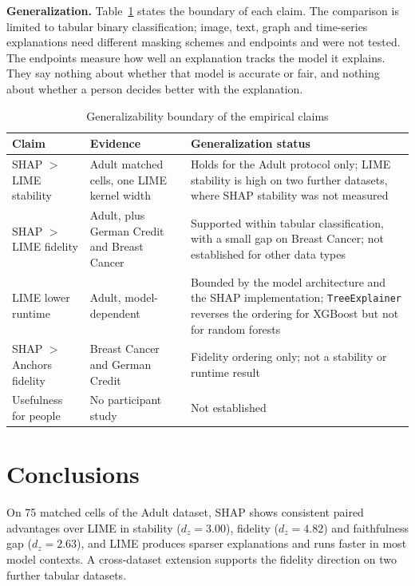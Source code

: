 \documentclass{cleiej}
\begin{document}
\textbf{Generalization.} Table~\ref{tab:generalizability_boundary} states
the boundary of each claim. The comparison is limited to tabular binary
classification; image, text, graph and time-series explanations need
different masking schemes and endpoints and were not tested. The endpoints
measure how well an explanation tracks the model it explains. They say
nothing about whether that model is accurate or fair, and nothing about
whether a person decides better with the explanation.

\begin{table}[htb]
\centering
\caption{Generalizability boundary of the empirical claims}
\label{tab:generalizability_boundary}
\begin{tabularx}{\linewidth}{p{3.0cm} X X}
\toprule
\textbf{Claim} & \textbf{Evidence} & \textbf{Generalization status} \\
\midrule
SHAP $>$ LIME stability & Adult matched cells, one LIME kernel width & Holds for the Adult protocol only; LIME stability is high on two further datasets, where SHAP stability was not measured \\
SHAP $>$ LIME fidelity & Adult, plus German Credit and Breast Cancer & Supported within tabular classification, with a small gap on Breast Cancer; not established for other data types \\
LIME lower runtime & Adult, model-dependent & Bounded by the model architecture and the SHAP implementation; \texttt{TreeExplainer} reverses the ordering for XGBoost but not for random forests \\
SHAP $>$ Anchors fidelity & Breast Cancer and German Credit & Fidelity ordering only; not a stability or runtime result \\
Usefulness for people & No participant study & Not established \\
\bottomrule
\end{tabularx}
\end{table}

\section{Conclusions}
\label{sec:conclusion}

On 75 matched cells of the Adult dataset, SHAP shows consistent paired
advantages over LIME in stability ($d_z = 3.00$), fidelity ($d_z = 4.82$)
and faithfulness gap ($d_z = 2.63$), and LIME produces sparser explanations
and runs faster in most model contexts. A cross-dataset extension supports
the fidelity direction on two further tabular datasets.
\end{document}
